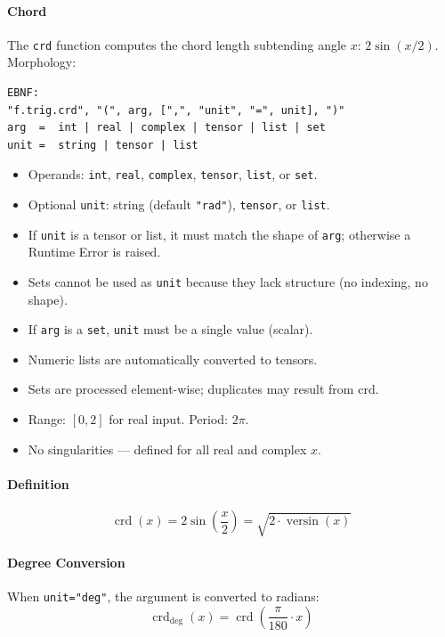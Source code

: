 \paragraph{Chord}
The \texttt{crd} function computes the chord length subtending angle $x$: $2\sin(x/2)$.\\
Morphology:
\begin{verbatim}
EBNF:
"f.trig.crd", "(", arg, [",", "unit", "=", unit], ")"
arg  =  int | real | complex | tensor | list | set
unit =  string | tensor | list
\end{verbatim}
\begin{itemize}
\item Operands: \texttt{int}, \texttt{real}, \texttt{complex}, \texttt{tensor}, \texttt{list}, or \texttt{set}.
\item Optional \texttt{unit}: string (default \texttt{"rad"}), \texttt{tensor}, or \texttt{list}.
\item If \texttt{unit} is a tensor or list, it must match the shape of \texttt{arg}; otherwise a Runtime Error is raised.
\item Sets cannot be used as \texttt{unit} because they lack structure (no indexing, no shape).
\item If \texttt{arg} is a \texttt{set}, \texttt{unit} must be a single value (scalar).
\item Numeric lists are automatically converted to tensors.
\item Sets are processed element-wise; duplicates may result from crd.
\item Range: $[0, 2]$ for real input. Period: $2\pi$.
\item No singularities — defined for all real and complex $x$.
\end{itemize}

\paragraph{Definition}
\[
\operatorname{crd}(x) = 2\sin\left(\frac{x}{2}\right) = \sqrt{2 \cdot \operatorname{versin}(x)}
\]

\paragraph{Degree Conversion}
When \texttt{unit="deg"}, the argument is converted to radians:
\[
\operatorname{crd}_{\text{deg}}(x) = \operatorname{crd}\left(\frac{\pi}{180} \cdot x\right)
\]

